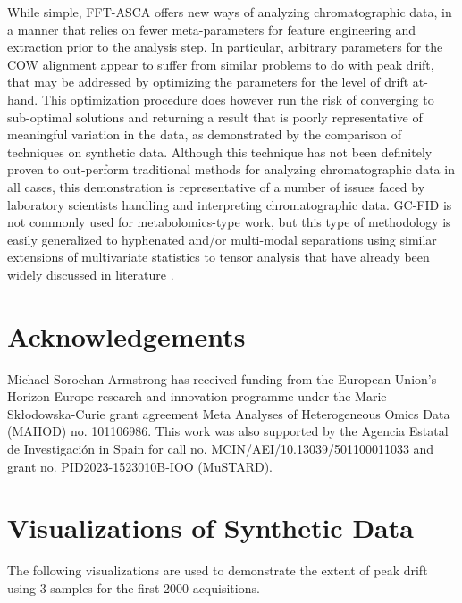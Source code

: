 \documentclass[preprint,12pt]{elsarticle}
\begin{document}
While simple, FFT-ASCA offers new ways of analyzing chromatographic data, in a manner that relies on fewer meta-parameters for feature engineering and extraction prior to the analysis step. In particular, arbitrary parameters for the COW alignment appear to suffer from similar problems to do with peak drift, that may be addressed by optimizing the parameters for the level of drift at-hand. This optimization procedure does however run the risk of converging to sub-optimal solutions and returning a result that is poorly representative of meaningful variation in the data, as demonstrated by the comparison of techniques on synthetic data. Although this technique has not been definitely proven to out-perform traditional methods for analyzing chromatographic data in all cases, this demonstration is representative of a number of issues faced by laboratory scientists handling and interpreting chromatographic data. GC-FID is not commonly used for metabolomics-type work, but this type of methodology is easily generalized to hyphenated and/or multi-modal separations using similar extensions of multivariate statistics to tensor analysis that have already been widely discussed in literature \cite{koleini2023complementary,armstrong2024replicate}. 

\section{Acknowledgements}

 Michael Sorochan Armstrong has received funding from the European Union's Horizon Europe research and innovation programme under the Marie Skłodowska-Curie grant agreement Meta Analyses of Heterogeneous Omics Data (MAHOD) no. 101106986. This work was also supported by the Agencia Estatal de Investigación in Spain for call no. MCIN/AEI/10.13039/501100011033 and grant no. PID2023-1523010B-IOO (MuSTARD).




\appendix

\section{Visualizations of Synthetic Data}\label{sec:vis}

The following visualizations are used to demonstrate the extent of peak drift using 3 samples for the first 2000 acquisitions.
\end{document}

